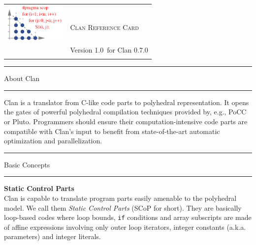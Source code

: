 \documentclass[landscape,a4paper]{article}
\def\clanversionnumber{0.7.0}
\def\versionnumber{1.0}
\def\titre#1{\begin{center}\hrule\vspace{0.1cm}#1
\vspace{0.07cm}\hrule\end{center}}
\begin{document}
\pagestyle{empty}
\raggedcolumns
\setlength{\premulticols}{100pt}
\setlength{\multicolsep}{10pt}
\begin{multicols}{3}

\begin{center}
\begin{tabular}{cl}
\multirow{2}{*}{\includegraphics[width=3cm]{images/logo_clan}}
& \\
& \Large{\textsc{Clan Reference Card}}\\
& \scriptsize{Version \versionnumber\ for Clan \clanversionnumber} \\
&
\end{tabular}
\end{center}

\titre{About Clan\vspace{0.07cm}}

\begin{small}
Clan is a translator from C-like code parts to polyhedral
representation. It opens the gates of powerful polyhedral compilation
techniques provided by, e.g., PoCC or Pluto. Programmers should ensure their
computation-intensive code parts are compatible with Clan's input to benefit
from state-of-the-art automatic optimization and parallelization.
\end{small}

\titre{Basic Concepts}

\begin{small}
\textbf{Static Control Parts}\\
Clan is capable to translate program parts easily amenable to the
polyhedral model. We call them \textit{Static Control Parts} (SCoP for short).
They are basically loop-based codes where loop bounds, \texttt{if} conditions and
array subscripts are made of affine expressions involving only outer
loop iterators, integer constants (a.k.a. parameters) and integer literals.


\end{small}
\end{multicols}
\end{document}
